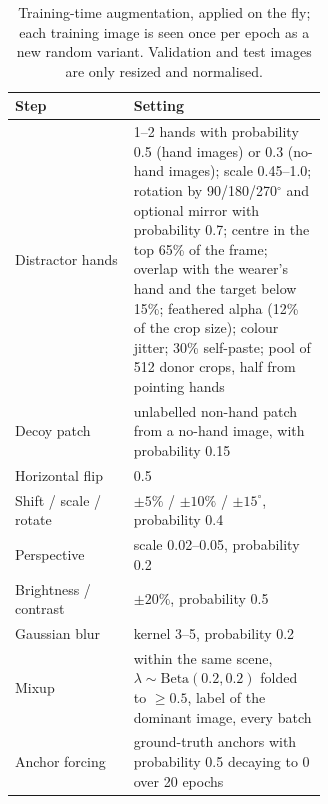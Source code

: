 \begin{table}[h]
  \caption{Training-time augmentation, applied on the fly; each training image is seen once per epoch as a new random variant. Validation and test images are only resized and normalised.}
  \label{tab:aug}
  \footnotesize
  \begin{tabular}{lp{0.62\linewidth}}
    \toprule
    Step & Setting \\
    \midrule
    Distractor hands & 1--2 hands with probability 0.5 (hand images) or 0.3 (no-hand images); scale 0.45--1.0; rotation by 90/180/270$^\circ$ and optional mirror with probability 0.7; centre in the top 65\% of the frame; overlap with the wearer's hand and the target below 15\%; feathered alpha (12\% of the crop size); colour jitter; 30\% self-paste; pool of 512 donor crops, half from pointing hands \\
    Decoy patch & unlabelled non-hand patch from a no-hand image, with probability 0.15 \\
    Horizontal flip & 0.5 \\
    Shift / scale / rotate & ${\pm}5\%$ / ${\pm}10\%$ / ${\pm}15^\circ$, probability 0.4 \\
    Perspective & scale 0.02--0.05, probability 0.2 \\
    Brightness / contrast & ${\pm}20\%$, probability 0.5 \\
    Gaussian blur & kernel 3--5, probability 0.2 \\
    Mixup & within the same scene, $\lambda\sim\mathrm{Beta}(0.2,0.2)$ folded to ${\geq}0.5$, label of the dominant image, every batch \\
    Anchor forcing & ground-truth anchors with probability 0.5 decaying to 0 over 20 epochs \\
    \bottomrule
  \end{tabular}
\end{table}

